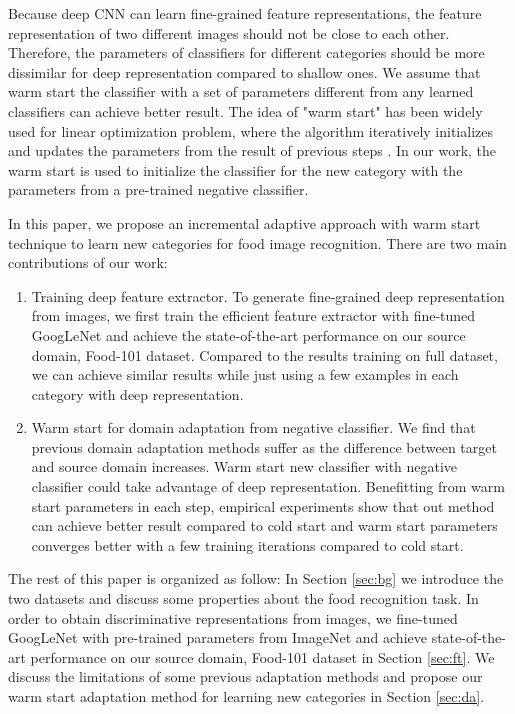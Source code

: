 Because deep CNN can learn fine-grained feature representations, the feature representation of two different images should not be close to each other. Therefore, the parameters of classifiers for different categories should be more dissimilar for deep representation compared to shallow ones. We assume that warm start the classifier with a set of parameters different from any learned classifiers can achieve better result.
The idea of "warm start" has been widely used for linear optimization problem, where the algorithm iteratively initializes and updates the parameters from the result of previous steps \cite{yildirim2002warm} \cite{john2008implementation} \cite{zeilinger2011real} \cite{chuwarm}. In our work, the warm start is used to initialize the classifier for the new category with the parameters from a pre-trained negative classifier.

 In this paper, we propose an incremental adaptive approach with warm start technique to learn new categories for food image recognition. There are two main contributions of our work:
\begin{enumerate}
  \item Training deep feature extractor. To generate fine-grained deep representation from images, we first train the efficient feature extractor with fine-tuned GoogLeNet and achieve the state-of-the-art performance on our source domain, Food-101 dataset. Compared to the results training on full dataset, we can achieve similar results while just using a few examples in each category with deep representation.
  \item Warm start for domain adaptation from negative classifier. We find that previous domain adaptation methods suffer as the difference between target and source domain increases. Warm start new classifier with negative classifier could take advantage of deep representation. Benefitting from warm start parameters in each step, empirical experiments show that out method can achieve better result compared to cold start and warm start parameters converges better with a few training iterations compared to cold start.
\end{enumerate}

The rest of this paper is organized as follow: In Section \ref{sec:bg} we introduce the two datasets and discuss some properties about the food recognition task. In order to obtain discriminative representations from images, we fine-tuned GoogLeNet with pre-trained parameters from ImageNet and achieve state-of-the-art performance on our source domain, Food-101 dataset in Section \ref{sec:ft}. We discuss the limitations of some previous adaptation methods and propose our warm start adaptation method for learning new categories in Section \ref{sec:da}.
